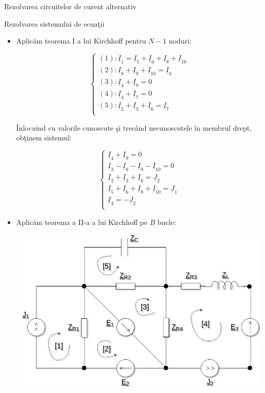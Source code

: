 \documentclass[a4paper]{article}
\begin{document}
\begin{section}{Rezolvarea circuitelor de curent alternativ}
\begin{subsection}{Rezolvarea sistemului de ecua\c tii \\}
\begin{itemize}
	\item Aplic\u am teorema I a lui Kirchhoff pentru $ N - 1 $ noduri:
	
 	\begin{large} \[ \left\{ \begin{array}{ll}
		(1): \underline{I}_1 =  \underline{I}_5 + \underline{I}_6 + \underline{I}_8 + \underline{I}_{10} \\
		(2): \underline{I}_8 + \underline{I}_9  + \underline{I}_{10} = \underline{I}_3 \\
		(3): \underline{I}_4 + \underline{I}_9 = 0 \\
		(4): \underline{I}_4 + \underline{I}_7 = 0 \\
		(5): \underline{I}_2 + \underline{I}_3 + \underline{I}_6 =  \underline{I}_7 \\
	\end{array} \right. \] \end{large}

	\^ Inlocuind cu valorile cunoscute \c si trec\^ and necunoscutele \^ in membrul drept, ob\c tinem sistemul: 

 	\begin{large} \[ \left\{ \begin{array}{ll}	
		\underline{I}_4 + \underline{I}_9 = 0 \\
		\underline{I}_3 - \underline{I}_8 - \underline{I}_9 - \underline{I}_{10}  = 0 \\
		\underline{I}_2 + \underline{I}_3 + \underline{I}_6 =  \underline{J}_2 \\
		\underline{I}_5 + \underline{I}_6 + \underline{I}_8 + \underline{I}_{10} = \underline{J}_1 \\
		\underline{I}_4 = - \underline{J}_2 \\
	\end{array} \right. \] \end{large}

	\item Aplic\u am teorema a II-a a lui Kirchhoff pe $ B $ bucle:

	\begin{center}
		\includegraphics[width=13cm, height=8cm]{bucle.jpg} %
	\end{center}


\end{itemize}
\end{subsection}
\end{section}
\end{document}
